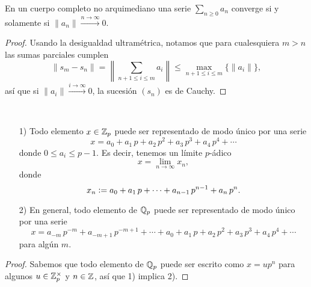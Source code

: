\documentclass{article}
\numberwithin{equation}{section}
\theoremstyle{definition}
\begin{document}
\begin{lema}
  \label{lema:series-convergentes-no-arquimedianas}
  En un cuerpo completo no arquimediano una serie $\sum_{n\ge 0} a_n$ converge
  si y solamente si $\|a_n\| \xrightarrow{n\to\infty} 0$.

  \begin{proof}
    Usando la desigualdad ultramétrica, notamos que para cualesquiera $m > n$
    las sumas parciales cumplen
    \[ \|s_m - s_n\| =
       \left\|\sum_{n+1\le i \le m} a_i\right\| \le
       \max_{n+1 \le i \le m} \{ \|a_i\| \}, \]
    así que si $\|a_i\| \xrightarrow{i\to\infty} 0$, la sucesión $(s_n)$ es
    de Cauchy.
  \end{proof}
\end{lema}

\begin{teorema}
  ~

  \begin{enumerate}
  \item[1)] Todo elemento $x \in \mathbb{Z}_p$ puede ser representado de modo único por
    una serie
    $$x = a_0 + a_1\,p + a_2\,p^2 + a_3\,p^3 + a_4\,p^4 + \cdots$$
    donde $0 \le a_i \le p-1$. Es decir, tenemos un límite $p$-ádico
    $$x = \lim_{n\to\infty} x_n,$$
    donde
    $$x_n \mathrel{\mathop:}= a_0 + a_1\,p + \cdots + a_{n-1}\,p^{n-1} + a_n\,p^n.$$

  \item[2)] En general, todo elemento de $\mathbb{Q}_p$ puede ser representado de modo
    único por una serie
    \[ x = a_{-m}\,p^{-m} + a_{-m+1}\,p^{-m+1} + \cdots +
      a_0 + a_1\,p + a_2\,p^2 + a_3\,p^3 + a_4\,p^4 + \cdots \]
    para algún $m$.
  \end{enumerate}

  \begin{proof}
    Sabemos que todo elemento de $\mathbb{Q}_p$ puede ser escrito como $x = up^n$ para
    algunos $u \in \mathbb{Z}_p^\times$ y $n\in \mathbb{Z}$, así que 1) implica 2).


\end{proof}
\end{teorema}
\end{document}
